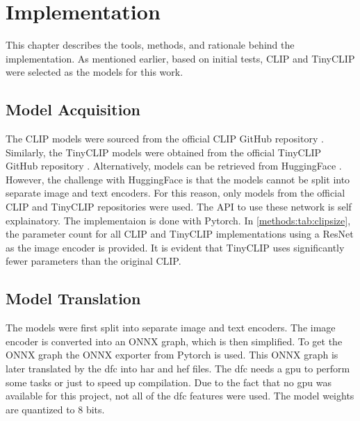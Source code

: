 \chapter{Implementation
    \label{chapter:implementation}}

This chapter describes the tools, methods, and rationale behind the implementation. 
As mentioned earlier, based on initial tests, CLIP and TinyCLIP were selected as the models for this work.


\section{Model Acquisition}

The CLIP models were sourced from the official CLIP GitHub repository \cite{clipgit}.
Similarly, the TinyCLIP models were obtained from the official TinyCLIP GitHub repository \cite{tinyclipgit}.
Alternatively, models can be retrieved from HuggingFace \cite{huggingface}.
However, the challenge with HuggingFace is that the models cannot be split into separate image and text encoders.
For this reason, only models from the official CLIP and TinyCLIP repositories were used.
The API to use these network is self explainatory.
The implementaion is done with Pytorch\cite{pytorch}.
In \cref{methods:tab:clipsize}, the parameter count for all CLIP and TinyCLIP implementations using a ResNet as the image encoder is provided.
It is evident that TinyCLIP uses significantly fewer parameters than the original CLIP.

\section{Model Translation
\label{implementation:sec:translation}}

The models were first split into separate image and text encoders.
The image encoder is converted into an ONNX graph, which is then simplified.
To get the ONNX graph the ONNX exporter from Pytorch is used.
This ONNX graph is later translated by the \acrshort{dfc} into \acrshort{har} and \acrshort{hef} files.
The \acrshort{dfc} needs a \acrshort{gpu} to perform some tasks or just to speed up compilation.
Due to the fact that no \acrshort{gpu} was available for this project, not all of the \acrshort{dfc} features were used.
The model weights are quantized to 8 bits.


